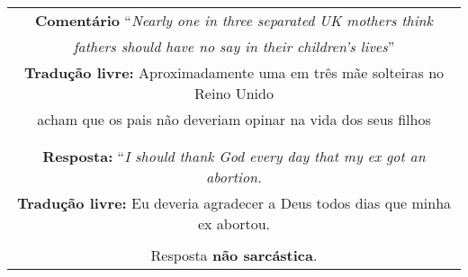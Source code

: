 \begin{center}
\begin{tabular}{|c|}

\hline

\textbf{Comentário} ``\textit{Nearly one in three separated UK mothers think} \\
\textit{fathers should have no say in their children's lives}'' \\

\textbf{Tradução livre:} Aproximadamente uma em três mãe solteiras no Reino Unido\\
acham que os pais não deveriam opinar na vida dos seus filhos \\ \\

\hline

\\

\textbf{Resposta:} ``\textit{I should thank God every day that my ex got an abortion.} \\

\textbf{Tradução livre:} Eu deveria agradecer a Deus todos dias que minha ex abortou. \\ \\

Resposta \textbf{não sarcástica}.

\\ \hline

\end{tabular}
\end{center}

